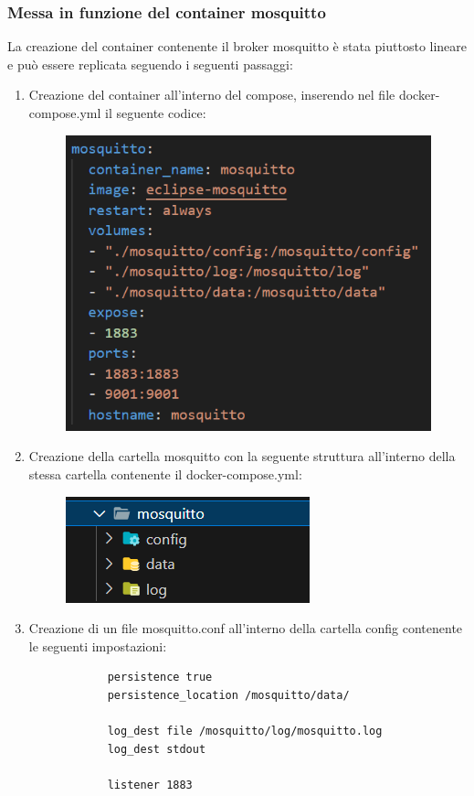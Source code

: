 \documentclass[]{article}
\begin{document}
\subsubsection*{Messa in funzione del container mosquitto}
La creazione del container contenente il broker mosquitto è stata piuttosto lineare e può essere replicata seguendo i seguenti passaggi:
\begin{enumerate}
    \item Creazione del container all'interno del compose, inserendo nel file docker-compose.yml il seguente codice:
    \begin{figure}[H]
        \centering
        \includegraphics[width=0.3\linewidth]{immagini/mosquitto_nel_docker_compose.png}
    \end{figure}
    \item Creazione della cartella mosquitto con la seguente struttura all'interno della stessa cartella contenente il docker-compose.yml:
    \begin{figure}[H]
        \centering
        \includegraphics[width=0.2\linewidth]{immagini/struttura_cartelle_mosquitto.png}        
    \end{figure}
    \item Creazione di un file mosquitto.conf all'interno della cartella config contenente le seguenti impostazioni:
    \begin{center}
        \begin{verbatim}
            persistence true
            persistence_location /mosquitto/data/
            
            log_dest file /mosquitto/log/mosquitto.log
            log_dest stdout
            
            listener 1883
            

\end{verbatim}
\end{center}
\end{enumerate}
\end{document}

